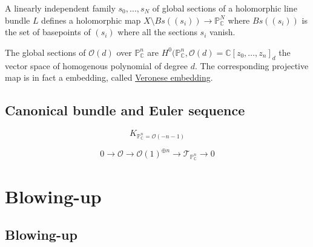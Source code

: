 \documentclass[11pt]{article}
\begin{document}
A linearly independent family \(s_0,\dots, s_N\) of global sections of a holomorphic
line bundle \(L\) defines a holomorphic map \(X\setminus Bs((s_i)) \longrightarrow
\mathbb{P}^N_{\mathbb{C}}\) where \(Bs((s_i))\) is the set of basepoints of
\((s_i)\) where all the sections \(s_i\) vanish.

The global sections of \(\mathcal{O}(d)\) over \(\mathbb{P}^n_{\mathbb{C}}\) are
\(H^0(\mathbb{P}^n_{\mathbb{C}}, \mathcal{O}(d) = \mathbb{C}[z_0,\dots,z_n]_d\) the
vector space of homogenous polynomial of degree \(d\). The corresponding projective map
is in fact a embedding, called \uline{Veronese embedding}.



\subsection{Canonical bundle and Euler sequence}
\label{sec:org1211c66}

\[
K_{\mathbb{P}^n_{\mathbb{C}} = \mathcal{O}(-n-1)}
\]

\[
0 \longrightarrow \mathcal{O} \longrightarrow \mathcal{O}(1)^{\oplus n} \longrightarrow
\mathcal{T}_{\mathbb{P}_{\mathbb{C}}^n} \longrightarrow 0
\]


\section{Blowing-up}
\label{sec:org18e1036}
\subsection{Blowing-up}
\label{sec:orgdf449a4}
\end{document}
